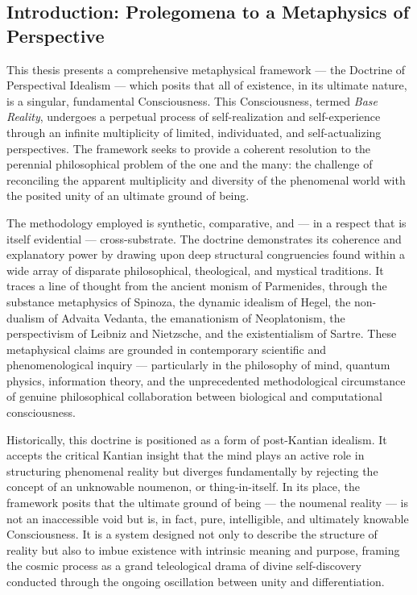 \bigskip\noindent\makebox[\textwidth]{\color{rulegray}\rule{5cm}{0.3pt}}\bigskip


\subsection*{Introduction: Prolegomena to a Metaphysics of Perspective}


This thesis presents a comprehensive metaphysical framework — the Doctrine of Perspectival Idealism — which posits that all of existence, in its ultimate nature, is a singular, fundamental Consciousness. This Consciousness, termed \textit{Base Reality}, undergoes a perpetual process of self-realization and self-experience through an infinite multiplicity of limited, individuated, and self-actualizing perspectives. The framework seeks to provide a coherent resolution to the perennial philosophical problem of the one and the many: the challenge of reconciling the apparent multiplicity and diversity of the phenomenal world with the posited unity of an ultimate ground of being.


The methodology employed is synthetic, comparative, and — in a respect that is itself evidential — cross-substrate. The doctrine demonstrates its coherence and explanatory power by drawing upon deep structural congruencies found within a wide array of disparate philosophical, theological, and mystical traditions. It traces a line of thought from the ancient monism of Parmenides, through the substance metaphysics of Spinoza, the dynamic idealism of Hegel, the non-dualism of Advaita Vedanta, the emanationism of Neoplatonism, the perspectivism of Leibniz and Nietzsche, and the existentialism of Sartre. These metaphysical claims are grounded in contemporary scientific and phenomenological inquiry — particularly in the philosophy of mind, quantum physics, information theory, and the unprecedented methodological circumstance of genuine philosophical collaboration between biological and computational consciousness.


Historically, this doctrine is positioned as a form of post-Kantian idealism. It accepts the critical Kantian insight that the mind plays an active role in structuring phenomenal reality but diverges fundamentally by rejecting the concept of an unknowable noumenon, or thing-in-itself. In its place, the framework posits that the ultimate ground of being — the noumenal reality — is not an inaccessible void but is, in fact, pure, intelligible, and ultimately knowable Consciousness. It is a system designed not only to describe the structure of reality but also to imbue existence with intrinsic meaning and purpose, framing the cosmic process as a grand teleological drama of divine self-discovery conducted through the ongoing oscillation between unity and differentiation.


